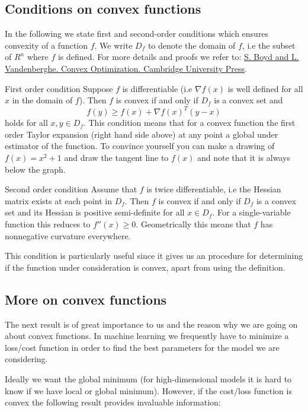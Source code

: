 \documentclass[%
oneside,                 %
final,                   %
10pt]{article}
\begin{document}
\subsection*{Conditions on convex functions}

In the following we state first and second-order conditions which
ensures convexity of a function $f$. We write $D_f$ to denote the
domain of $f$, i.e the subset of $R^n$ where $f$ is defined. For more
details and proofs we refer to: \href{{http://stanford.edu/boyd/cvxbook/, 2004}}{S. Boyd and L. Vandenberghe. Convex Optimization. Cambridge University Press}.

 First order condition
Suppose $f$ is differentiable (i.e $\nabla f(x)$ is well defined for
all $x$ in the domain of $f$). Then $f$ is convex if and only if $D_f$
is a convex set and $$f(y) \geq f(x) + \nabla f(x)^T (y-x) $$ holds
for all $x,y \in D_f$. This condition means that for a convex function
the first order Taylor expansion (right hand side above) at any point
a global under estimator of the function. To convince yourself you can
make a drawing of $f(x) = x^2+1$ and draw the tangent line to $f(x)$ and
note that it is always below the graph.  

 Second order condition 
Assume that $f$ is twice
differentiable, i.e the Hessian matrix exists at each point in
$D_f$. Then $f$ is convex if and only if $D_f$ is a convex set and its
Hessian is positive semi-definite for all $x\in D_f$. For a
single-variable function this reduces to $f''(x) \geq 0$. Geometrically this means that $f$ has nonnegative curvature
everywhere.

This condition is particularly useful since it gives us an procedure for determining if the function under consideration is convex, apart from using the definition.

\subsection*{More on convex functions}

The next result is of great importance to us and the reason why we are
going on about convex functions. In machine learning we frequently
have to minimize a loss/cost function in order to find the best
parameters for the model we are considering. 

Ideally we want the
global minimum (for high-dimensional models it is hard to know
if we have local or global minimum). However, if the cost/loss function
is convex the following result provides invaluable information:
\end{document}
